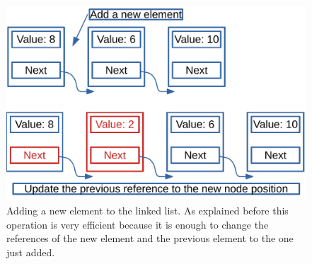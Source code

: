 \begin{figure}[H]
	\begin{center}
		\includegraphics[scale=.6]{chapters/datastructures/images/linked_list_2.pdf}
		\caption[Adding a new element to a linked list.]{Adding a new element to the linked list. As explained before this operation is very efficient because it is enough to change the references of the new element and the previous element to the one just added.}
		\label{linked_list_2}
	\end{center}
\end{figure}

